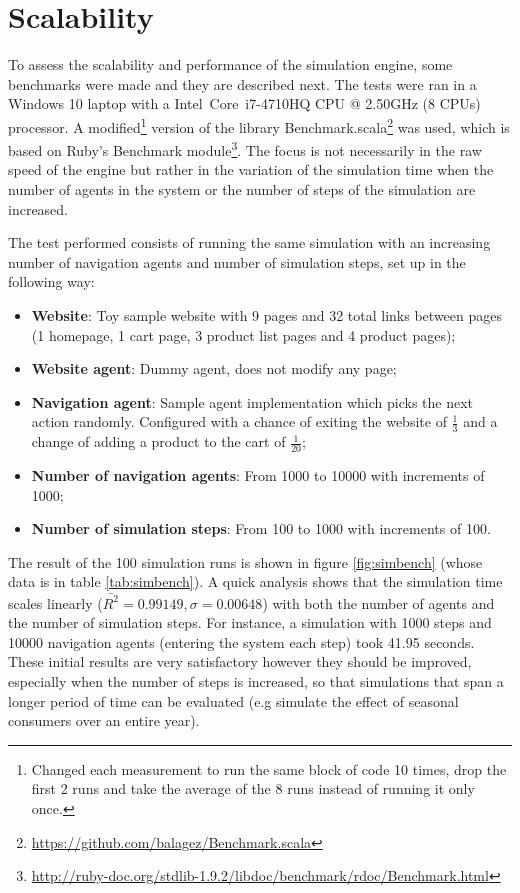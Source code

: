 \section{Scalability}

To assess the scalability and performance of the simulation engine, some 
benchmarks were made and they are described next. The tests were ran in a 
Windows 10 laptop with a Intel\textregistered~Core\texttrademark~i7-4710HQ CPU 
@ 2.50GHz (8 CPUs) processor. A modified\footnote{Changed each measurement to 
run the same block of code 10 times, drop the first 2 runs and take the average 
of the 8 runs instead of running it only once.} version of the library 
Benchmark.scala\footnote{\url{https://github.com/balagez/Benchmark.scala}} was 
used, which is based on Ruby's Benchmark 
module\footnote{\url{http://ruby-doc.org/stdlib-1.9.2/libdoc/benchmark/rdoc/Benchmark.html}}.
 The focus is not necessarily in the raw speed of the engine but rather in the 
variation of the simulation time when the number of agents in the system or the 
number of steps of the simulation are increased.

The test performed consists of running the same simulation with an 
increasing number of navigation agents and number of simulation steps, set up 
in the following way:

\begin{itemize}
    \item \textbf{Website}: Toy sample website with 9 pages and 32 total links 
    between pages (1 homepage, 1 cart page, 3 product list pages and 4 product 
    pages);
    \item \textbf{Website agent}: Dummy agent, does not modify any page;
    \item \textbf{Navigation agent}: Sample agent implementation which 
    picks the next action randomly. Configured with a chance of exiting the 
    website of $\frac{1}{3}$ and a change of adding a product to the cart of 
    $\frac{1}{20}$;
    \item \textbf{Number of navigation agents}: From 1000 to 10000 with 
    increments of 1000;
    \item \textbf{Number of simulation steps}: From 100 to 1000 with increments 
    of 100.
\end{itemize}

The result of the 100 simulation runs is shown in figure \ref{fig:simbench} 
(whose data is in table \ref{tab:simbench}). A quick analysis shows that the 
simulation time scales linearly ($\bar{R^{2}} = 0.99149, \sigma = 0.00648$) 
with both the number of agents and the number of simulation steps. For 
instance, a simulation with 1000 steps and 10000 navigation agents (entering 
the system each step)	 took 41.95 seconds. These initial results are very 
satisfactory however they should be improved, especially when the number of 
steps is increased, so that simulations that span a longer period of time can 
be evaluated (e.g simulate the effect of seasonal consumers over an entire 
year).

